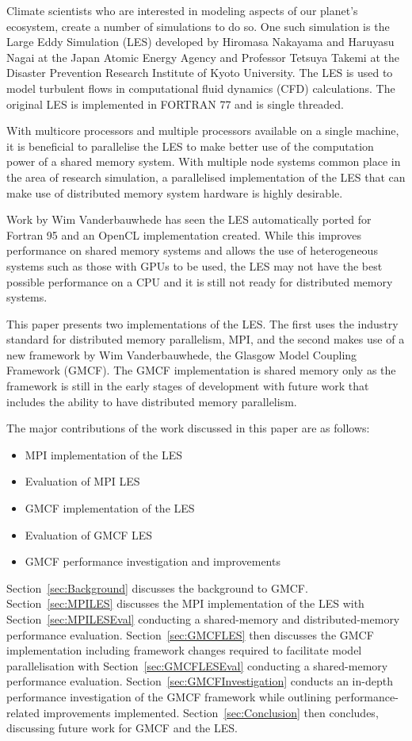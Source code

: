Climate scientists who are interested in modeling aspects of our planet's
ecosystem, create a number of simulations to do so. One such simulation is the
Large Eddy Simulation (LES) developed by Hiromasa Nakayama and Haruyasu Nagai at
the Japan Atomic Energy Agency and Professor Tetsuya Takemi at the Disaster
Prevention Research Institute of Kyoto University. The LES is used to model
turbulent flows in computational fluid dynamics (CFD) calculations. The original
LES is implemented in FORTRAN 77 and is single threaded.

With multicore processors and multiple processors available on a single machine,
it is beneficial to parallelise the LES to make better use of the computation
power of a shared memory system. With multiple node systems common place in the
area of research simulation, a parallelised implementation of the LES that can
make use of distributed memory system hardware is highly desirable.

Work by Wim Vanderbauwhede has seen the LES automatically ported for Fortran 95
and an OpenCL implementation created. While this improves performance on shared
memory systems and allows the use of heterogeneous systems such as those with
GPUs to be used, the LES may not have the best possible performance on a CPU and
it is still not ready for distributed memory systems.

This paper presents two implementations of the LES. The first uses the industry
standard for distributed memory parallelism, MPI, and the second makes use of a
new framework by Wim Vanderbauwhede, the Glasgow Model Coupling Framework
(GMCF). The GMCF implementation is shared memory only as the framework is still
in the early stages of development with future work that includes the ability to
have distributed memory parallelism.

The major contributions of the work discussed in this paper are as follows:

\begin{itemize}
    \item MPI implementation of the LES
    \item Evaluation of MPI LES
    \item GMCF implementation of the LES
    \item Evaluation of GMCF LES
    \item GMCF performance investigation and improvements
\end{itemize}

Section~\ref{sec:Background} discusses the background to GMCF.
Section~\ref{sec:MPILES} discusses the MPI implementation of the LES with
Section~\ref{sec:MPILESEval} conducting a shared-memory and distributed-memory
performance evaluation. Section~\ref{sec:GMCFLES} then discusses the GMCF
implementation including framework changes required to facilitate model
parallelisation with Section~\ref{sec:GMCFLESEval} conducting a shared-memory
performance evaluation. Section~\ref{sec:GMCFInvestigation} conducts an in-depth
performance investigation of the GMCF framework while outlining
performance-related improvements implemented. Section~\ref{sec:Conclusion} then
concludes, discussing future work for GMCF and the LES.

